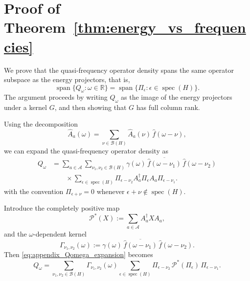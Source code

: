 \documentclass[showpacs,amsmath,amssymb,twocolumn,prx,superscriptaddress,10pt,aps,nofootinbib]{revtex4-2}
\newcommand{\vspan}{\operatorname{span}}
\begin{document}
\section{Proof of Theorem~\ref{thm:energy_vs_frequencies}}
\label{sec:proof_energy_vs_frequencies}

We prove that the quasi-frequency operator density spans the same operator subspace as the energy projectors, that is,
\[
\vspan\{Q_{\omega}:\omega\in\mathbb R\}
=
\vspan\{\Pi_{\epsilon}:\epsilon\in\operatorname{spec}(H)\}.
\]
The argument proceeds by writing \(Q_{\omega}\) as the image of the energy projectors under a kernel \(G\), and then showing that \(G\) has full column rank.

Using the decomposition
\[
\hat A_a(\omega)=\sum_{\nu\in\mathcal B(H)} \hat A_a(\nu)\,\hat f(\omega-\nu),
\]
we can expand the quasi-frequency operator density as
\begin{equation}
\label{eq:appendix_Qomega_expansion}
\begin{split}
Q_{\omega}
&=
\sum_{a\in\mathcal A}
\sum_{\nu_1,\nu_2\in\mathcal B(H)}
\gamma(\omega)\,
\overline{\hat f(\omega-\nu_1)}\,\hat f(\omega-\nu_2)
\\
&\qquad\times
\sum_{\epsilon\in\operatorname{spec}(H)}
\Pi_{\epsilon-\nu_2}A_a^\dagger \Pi_{\epsilon}A_a\Pi_{\epsilon-\nu_1}.
\end{split}
\end{equation}
with the convention \(\Pi_{\epsilon+\nu}=0\) whenever \(\epsilon+\nu\notin\operatorname{spec}(H)\).

Introduce the completely positive map
\begin{equation}
    \mathcal P^*(X):=\sum_{a\in\mathcal A} A_a^\dagger X A_a,
\end{equation}
and the \(\omega\)-dependent kernel
\begin{equation}
    \Gamma_{\nu_1,\nu_2}(\omega)
    :=
    \gamma(\omega)\,\overline{\hat f(\omega-\nu_1)}\,\hat f(\omega-\nu_2).
\end{equation}
Then \eqref{eq:appendix_Qomega_expansion} becomes
\begin{equation}
\label{eq:appendix_Qomega_compact}
    Q_{\omega}
    =
    \sum_{\nu_1,\nu_2\in\mathcal B(H)}
    \Gamma_{\nu_1,\nu_2}(\omega)
    \sum_{\epsilon\in\operatorname{spec}(H)}
    \Pi_{\epsilon-\nu_2}\,\mathcal P^*(\Pi_{\epsilon})\,\Pi_{\epsilon-\nu_1}.
\end{equation}
\end{document}

